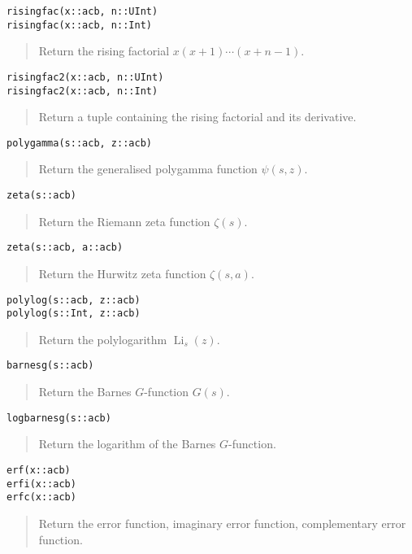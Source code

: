 \documentclass[a4paper,10pt]{article}
\newcommand{\desc}[1]{\vspace{-3mm}\begin{quote}#1\end{quote}}
\begin{document}
{{\begin{lstlisting}
risingfac(x::acb, n::UInt)
risingfac(x::acb, n::Int)
\end{lstlisting}

\desc{Return the rising factorial $x (x+1) \cdots (x+n-1)$.}

\begin{lstlisting}
risingfac2(x::acb, n::UInt)
risingfac2(x::acb, n::Int)
\end{lstlisting}

\desc{Return a tuple containing the rising factorial and its derivative.}

\begin{lstlisting}
polygamma(s::acb, z::acb)
\end{lstlisting}

\desc{Return the generalised polygamma function $\psi(s,z)$.}

\begin{lstlisting}
zeta(s::acb)
\end{lstlisting}

\desc{Return the Riemann zeta function $\zeta(s)$.}

\begin{lstlisting}
zeta(s::acb, a::acb)
\end{lstlisting}

\desc{Return the Hurwitz zeta function $\zeta(s,a)$.}

\begin{lstlisting}
polylog(s::acb, z::acb)
polylog(s::Int, z::acb)
\end{lstlisting}

\desc{Return the polylogarithm $\operatorname{Li}_s(z)$.}

\begin{lstlisting}
barnesg(s::acb)
\end{lstlisting}

\desc{Return the Barnes $G$-function $G(s)$.}

\begin{lstlisting}
logbarnesg(s::acb)
\end{lstlisting}

\desc{Return the logarithm of the Barnes $G$-function.}

\begin{lstlisting}
erf(x::acb)
erfi(x::acb)
erfc(x::acb)
\end{lstlisting}

\desc{Return the error function, imaginary error function, complementary error function.}

}}
\end{document}
